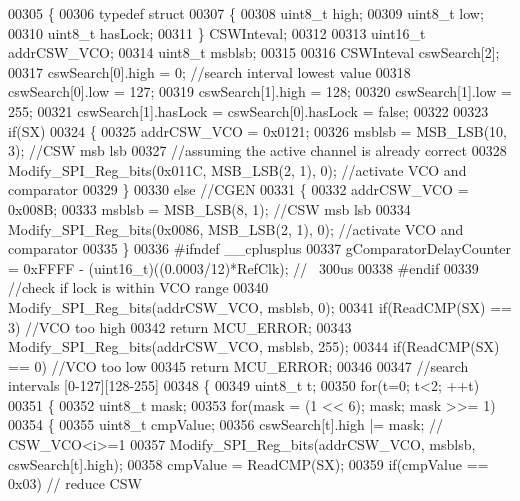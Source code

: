 \begin{DoxyCode}
00305 \{
00306     \textcolor{keyword}{typedef} \textcolor{keyword}{struct}
00307     \{
00308         uint8\_t high;
00309         uint8\_t low;
00310         uint8\_t hasLock;
00311     \} CSWInteval;
00312 
00313     uint16\_t addrCSW\_VCO;
00314     uint8\_t msblsb;
00315 
00316     CSWInteval cswSearch[2];
00317     cswSearch[0].high = 0; \textcolor{comment}{//search interval lowest value}
00318     cswSearch[0].low = 127;
00319     cswSearch[1].high = 128;
00320     cswSearch[1].low = 255;
00321     cswSearch[1].hasLock = cswSearch[0].hasLock = \textcolor{keyword}{false};
00322 
00323     \textcolor{keywordflow}{if}(SX)
00324     \{
00325         addrCSW\_VCO = 0x0121;
00326         msblsb = MSB_LSB(10, 3); \textcolor{comment}{//CSW msb lsb}
00327         \textcolor{comment}{//assuming the active channel is already correct}
00328         Modify_SPI_Reg_bits(0x011C, MSB_LSB(2, 1), 0); \textcolor{comment}{//activate VCO and comparator}
00329     \}
00330     \textcolor{keywordflow}{else} \textcolor{comment}{//CGEN}
00331     \{
00332         addrCSW\_VCO = 0x008B;
00333         msblsb = MSB_LSB(8, 1); \textcolor{comment}{//CSW msb lsb}
00334         Modify_SPI_Reg_bits(0x0086, MSB_LSB(2, 1), 0); \textcolor{comment}{//activate VCO and comparator}
00335     \}
00336 \textcolor{preprocessor}{#ifndef \_\_cplusplus}
00337     gComparatorDelayCounter = 0xFFFF - (uint16\_t)((0.0003/12)*RefClk); \textcolor{comment}{// ~300us}
00338 \textcolor{preprocessor}{#endif}
00339     \textcolor{comment}{//check if lock is within VCO range}
00340     Modify_SPI_Reg_bits(addrCSW\_VCO, msblsb, 0);
00341     \textcolor{keywordflow}{if}(ReadCMP(SX) == 3) \textcolor{comment}{//VCO too high}
00342         \textcolor{keywordflow}{return} MCU_ERROR;
00343     Modify_SPI_Reg_bits(addrCSW\_VCO, msblsb, 255);
00344     \textcolor{keywordflow}{if}(ReadCMP(SX) == 0) \textcolor{comment}{//VCO too low}
00345         \textcolor{keywordflow}{return} MCU_ERROR;
00346 
00347     \textcolor{comment}{//search intervals [0-127][128-255]}
00348     \{
00349         uint8\_t t;
00350         \textcolor{keywordflow}{for}(t=0; t<2; ++t)
00351         \{
00352             uint8\_t mask;
00353             \textcolor{keywordflow}{for}(mask = (1 << 6); mask; mask >>= 1)
00354             \{
00355                 uint8\_t cmpValue;
00356                 cswSearch[t].high |= mask; \textcolor{comment}{// CSW\_VCO<i>=1}
00357                 Modify_SPI_Reg_bits(addrCSW\_VCO, msblsb, cswSearch[t].high);
00358                 cmpValue = ReadCMP(SX);
00359                 \textcolor{keywordflow}{if}(cmpValue == 0x03) \textcolor{comment}{// reduce CSW}

\end{DoxyCode}

